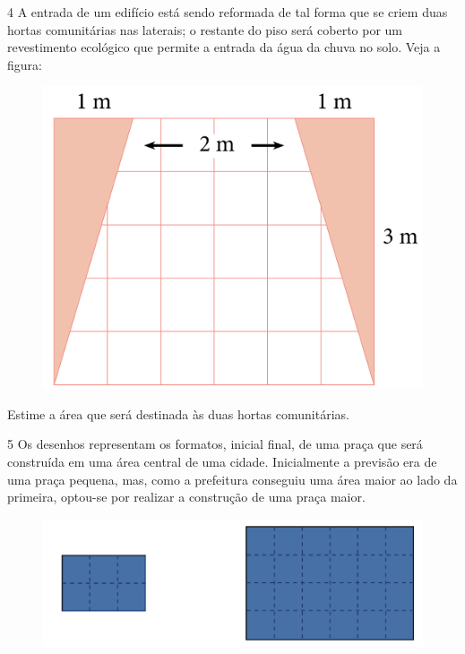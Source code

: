 
\num{4} A entrada de um edifício está sendo reformada de tal forma que se
criem duas hortas comunitárias nas laterais; o restante do piso será coberto por um revestimento ecológico que permite a entrada da água da chuva no solo. Veja
a figura:

\begin{figure}[htpb!]
\centering
\includegraphics[width=.45\textwidth]{../ilustracoes/MAT5/SAEB_5ANO_MAT_figura38.png}
\end{figure}

Estime a área que será destinada às duas hortas comunitárias.



\pagebreak

\num{5} Os desenhos representam os formatos, inicial  final, de uma praça que será construída em uma
área central de uma cidade. Inicialmente a previsão era de uma praça
pequena, mas, como a prefeitura conseguiu uma área maior ao lado da
primeira, optou-se por realizar a construção de uma praça maior.

\begin{figure}[htpb!]
\centering
\includegraphics[width=.5\textwidth]{../ilustracoes/MAT5/SAEB_5ANO_MAT_figura39.png}
\end{figure}

